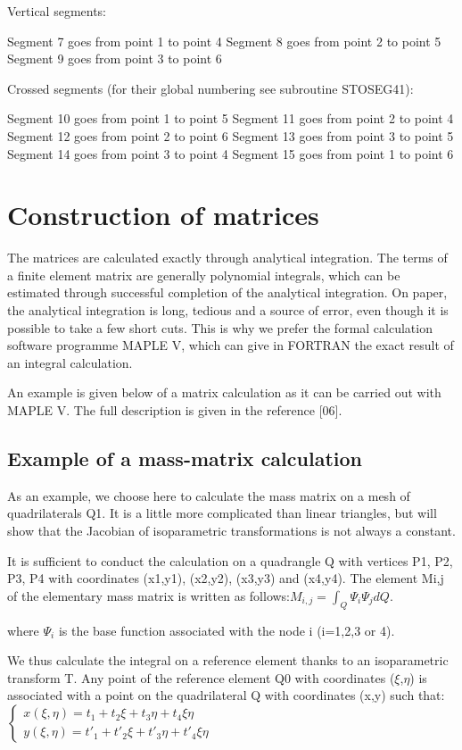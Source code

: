Vertical segments:

Segment 7 goes from point 1 to point 4
Segment 8 goes from point 2 to point 5
Segment 9 goes from point 3 to point 6

Crossed segments (for their global numbering see subroutine STOSEG41):

Segment 10 goes from point 1 to point 5
Segment 11 goes from point 2 to point 4
Segment 12 goes from point 2 to point 6
Segment 13 goes from point 3 to point 5
Segment 14 goes from point 3 to point 4
Segment 15 goes from point 1 to point 6

\section{Construction of matrices}

The \bief matrices are calculated exactly through analytical integration. The
terms of a finite element matrix are generally polynomial integrals, which can
be estimated through successful completion of the analytical integration. On
paper, the analytical integration is long, tedious and a source of error, even
though it is possible to take a few short cuts. This is why we prefer the
formal calculation software programme MAPLE V, which can give in FORTRAN
the exact result of an integral calculation.

An example is given below of a matrix calculation as it can be carried out with
MAPLE V. The full description is given in the reference [06].

\subsection{Example of a mass-matrix calculation}

As an example, we choose here to calculate the mass matrix on a mesh of
quadrilaterals Q1. It is a little more complicated than linear triangles, but
will show that the Jacobian of isoparametric transformations is not always a
constant.

It is sufficient to conduct the calculation on a quadrangle Q with vertices P1,
P2, P3, P4 with coordinates (x1,y1), (x2,y2), (x3,y3) and (x4,y4). The element
Mi,j of the elementary mass matrix is written as follows:$M_{i,j} =\int
_{Q}\Psi _{i}  \Psi _{j} dQ$.

where $\Psi _{i}$ is the base function associated with the node i (i=1,2,3 or
4).

We thus calculate the integral on a reference element thanks to an
isoparametric transform T. Any point of the reference element Q0 with
coordinates ($\xi$,$\eta$) is associated with a point on the quadrilateral Q
with coordinates (x,y) such that:
$\left\{
  \begin{array}{l}
x(\xi,\eta) = t_{1} + t_{2}\xi + t_{3}\eta + t_{4}\xi\eta \\
y(\xi,\eta) = t'_{1} + t'_{2}\xi + t'_{3}\eta + t'_{4}\xi\eta
\end{array}\right.$


